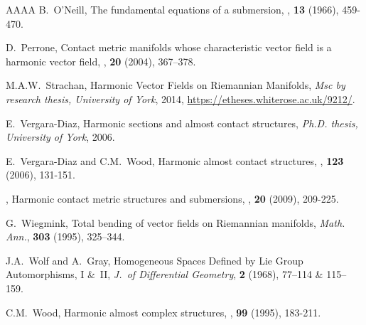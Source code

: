\documentclass[a4paper,reqno]{amsart}
\theoremstyle{definition}
\theoremstyle{remark}
\theoremstyle{plain}
\numberwithin{equation}{section}
\begin{document}
\begin{thebibliography}{AAAA}
B.~O'Neill,
\newblock The fundamental equations of a submersion, 
, {\bf 13} (1966), 459-470.

D.~Perrone, 
\newblock Contact metric manifolds whose characteristic vector field is a harmonic vector field, 
, {\bf 20} (2004), 367--378.

 M.A.W.~Strachan, Harmonic Vector Fields on
  Riemannian Manifolds, \emph{Msc by research thesis, University
    of York}, {2014}, 
  \url{https://etheses.whiterose.ac.uk/9212/}.
  
E.~Vergara-Diaz,
\newblock Harmonic sections and almost contact structures, 
\newblock \emph{Ph.D. thesis, University of York}, 2006.

E.~Vergara-Diaz and C.M.~Wood,
\newblock Harmonic almost contact structures, 
, {\bf 123} (2006), 131-151.

\bysame,
\newblock Harmonic contact metric structures and submersions, 
, {\bf 20} (2009), 209-225.

 G.~Wiegmink, Total bending of vector fields on Riemannian manifolds, \emph{Math. Ann.}, \textbf{303} (1995), 325--344.

 J.A.~Wolf and A.~Gray, Homogeneous Spaces
Defined by Lie Group Automorphisms, I \&~II, \emph{J.~of Differential
Geometry}, \textbf{2} (1968), 77--114 \& 115--159.


C.M.~Wood,
\newblock Harmonic almost complex structures, 
, {\bf 99} (1995), 183-211.


\end{thebibliography}

\vfill
\end{document}
